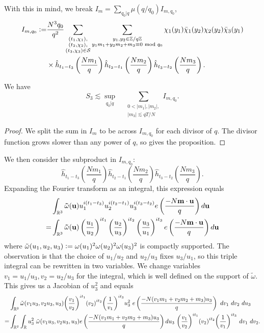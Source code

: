 With this in mind, we break $I_m=\sum_{q_0|q}\mu(q/q_0)I_{m,q_0}$,\begin{align*}
I_{m,q_0}\mathrel{\mathop:}=&\frac{N^3q_0}{q^2}\sum_{\substack{(t_1,\chi_1),\\(t_2,\chi_2),\\(t_3,\chi_3)\in\mathcal{S}}} \sum_{\substack{y_1,y_2 \in\mathbb{Z}/q\mathbb{Z} \\ y_1m_1+y_2m_2+m_3\equiv 0 \textrm{ mod } q_0}}\chi_1(y_1)\bar{\chi}_1(y_2)\chi_2(y_2)\bar{\chi}_3(y_1)\\
&\times \hat{h}_{t_1-t_3}\left(\frac{Nm_1}{q}\right)\hat{h}_{t_2-t_1}\left(\frac{Nm_2}{q}\right)\hat{h}_{t_3-t_2}\left(\frac{Nm_3}{q}\right).
\end{align*}
\begin{proposition}  \label{divisorreduction}We have\[
    S_3 \lesssim \sup_{q_0|q}\quad \sum_{\substack{0<|m_1|,|m_2|,\\|m_3|\lesssim qT/N}} I_{m,q_0}.
    \]
\end{proposition}
\begin{proof}
    We split the sum in $I_m$ to be across $I_{m,q_0}$ for each divisor of $q$. The divisor function grows slower than any power of $q$, so gives the proposition.
\end{proof}
We then consider the subproduct in $I_{m,q_0}$: \[
	\hat{h}_{t_1-t_3}\left(\frac{Nm_1}{q}\right)\hat{h}_{t_2-t_1}\left(\frac{Nm_2}{q}\right)\hat{h}_{t_3-t_2}\left(\frac{Nm_3}{q}\right).
\]
Expanding the Fourier transform as an integral, this expression equals \begin{align*}
	 &\int_{\mathbb{R}^3}\mathbf{\tilde{\omega}}(\mathbf{u})u_1^{i(t_1-t_3)}u_2^{i(t_2-t_1)}u_3^{i(t_3-t_2)}e\left(\frac{-N\mathbf{m}\cdot \mathbf{u}}{q}\right)d\mathbf{u}\\
	 =&\int_{\mathbb{R}^3}\mathbf{\tilde{\omega}}(\mathbf{u})\left(\frac{u_1}{u_2}\right)^{it_1}\left(\frac{u_2}{u_3}\right)^{it_2}\left(\frac{u_3}{u_1}\right)^{it_3}
	 e\left(\frac{-N\mathbf{m}\cdot \mathbf{u}}{q}\right)d\mathbf{u}
	 \end{align*}
	 where $\tilde{\omega}(u_1,u_2,u_3)\mathrel{\mathop:}= \omega(u_1)^2\omega(u_2)^2\omega(u_3)^2$ is compactly supported. The observation is that the choice of $u_1/u_2$ and $u_2/u_3$ fixes $u_3/u_1$, so this triple integral can be rewritten in two variables. We change variables $v_1=u_1/u_3,v_2=u_2/u_3$ for the integral, which is well defined on the support of $\tilde{\omega}$. This gives us a Jacobian of $u_3^2$ and equals
	 \begin{equation}\label{im1integral}
        \begin{split}
	&\int_{\reals^3}\tilde{\omega}(v_1u_3,v_2u_3,u_3) {\left(\frac{v_1}{v_2}\right)}^{it_1} {\left(v_2\right)}^{it_2}{\left(\frac{1}{v_1}\right)}^{it_3} u_3^2 \ e\left(\frac{-N(v_1m_1+v_2m_2+m_3)u_3}{q}\right)\ dv_1\ dv_2\ du_3\\
	=&\int_{\reals^2}\int_\reals u_3^2 \ \tilde{\omega}(v_1u_3,v_2u_3,u_3) e\left(\frac{-N(v_1m_1+v_2m_2+m_3)u_3}{q}\right)  du_3 \ {\left(\frac{v_1}{v_2}\right)}^{it_1} {\left(v_2\right)}^{it_2}{\left(\frac{1}{v_1}\right)}^{it_3}  \ dv_1\ dv_2.\\
     \end{split}
\end{equation}
